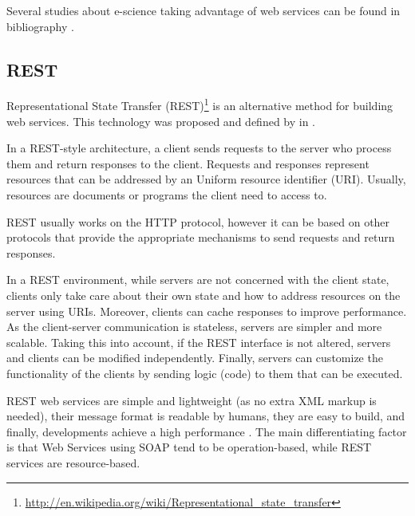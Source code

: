 Several studies about e-science taking advantage of web services can be found in bibliography \cite{Oinn04Taverna,davidson08workflows,Ludascher06Kepler,Perera06workflows}.

\subsection{REST}
Representational State Transfer (REST)\footnote{\url{http://en.wikipedia.org/wiki/Representational_state_transfer}} is an alternative method for building web services.
This technology was proposed and defined by  in \cite{Fielding2002}.

In a REST-style architecture, a client sends requests to the server who process them and return responses to the client.
Requests and responses represent resources that can be addressed by an Uniform resource identifier (URI). Usually, resources are documents or programs the client need to access to.

REST usually works on the HTTP protocol, however it can be based on other protocols that provide the appropriate mechanisms to send requests and return responses.

In a REST environment, while servers are not concerned with the client state, clients only take care about their own state and how to address resources on the server using URIs. Moreover, clients can cache responses to improve performance.
As the client-server communication is stateless, servers are simpler and more scalable. 
Taking this into account, if the REST interface is not altered, servers and clients can be modified independently.
Finally, servers can customize the functionality of the clients by sending logic (code) to them that can be executed.


REST web services are simple and lightweight (as no extra XML markup is needed), their message format is readable by humans, they are easy to build, and finally, developments achieve a high performance \cite{Daigneau2011}. The main differentiating factor is that Web Services using SOAP tend to be operation-based, while REST services are resource-based.

